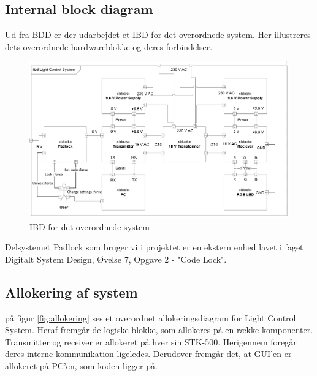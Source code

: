\documentclass[oneside]{memoir}
\begin{document}
		\subsection{Internal block diagram}
		Ud fra BDD er der udarbejdet et IBD for det overordnede system. Her illustreres dets overordnede hardwareblokke og deres forbindelser.
		\begin{figure}[H]
\centering
\centerline{\includegraphics[width=1.1\linewidth]{"billeder til latex/IBDoverordnet"}}
\caption{ IBD for det overordnede system }
\label{fig:IBDoverordnet}
\end{figure}

\begin{flushleft}
		Delsystemet Padlock som bruger vi i projektet er en ekstern enhed lavet i faget Digitalt System Design, Øvelse 7, Opgave 2 - "Code Lock".
\end{flushleft}

		\newpage
		\subsection{Allokering af system}
		
		på figur \ref{fig:allokering} ses et overordnet allokeringsdiagram for Light Control System. Heraf fremgår de logiske blokke, som allokeres på en række komponenter. Transmitter og receiver er allokeret på hver sin STK-500. Herigennem foregår deres interne kommunikation ligeledes. Derudover fremgår det, at GUI’en er allokeret på PC’en, som koden ligger på.
\end{document}
